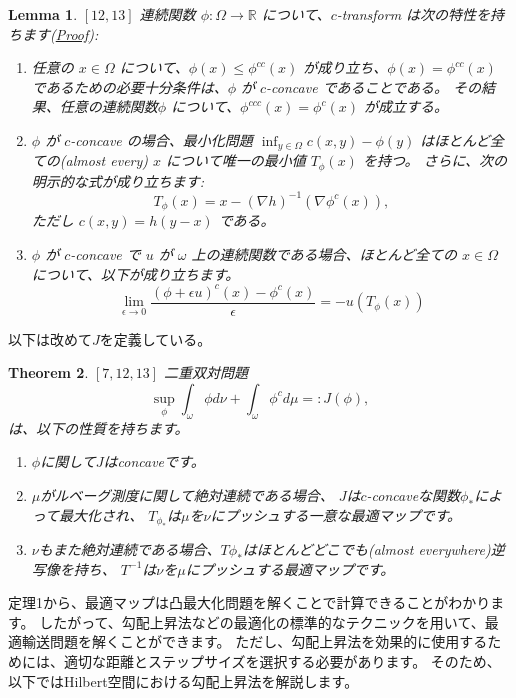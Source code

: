 \documentclass{jsarticle}
\newtheorem{thm}{Theorem}[section]
\newtheorem{lem}[thm]{Lemma}
\theoremstyle{definition}
\begin{document}
\begin{lem}
  \label{lem:c-transform}
  $\left[ 12, 13 \right]$
  連続関数 $\phi: \Omega \to \mathbb{R}$ について、$c$-transform は次の特性を持ちます(\hyperlink{proof:lem:c-transform}{Proof}):
  \begin{enumerate}
  \item 任意の $x \in \Omega$ について、$\phi(x) \le \phi^{cc}(x)$ が成り立ち、$\phi(x) = \phi^{cc}(x)$ であるための必要十分条件は、$\phi$ が $c$-concave であることである。
  その結果、任意の連続関数$\phi$ について、$\phi^{ccc}(x) = \phi^{c}(x)$ が成立する。
  
  \item $\phi$ が $c$-concave の場合、最小化問題 $\inf_{y \in \Omega} c(x, y) - \phi(y)$ はほとんど全ての(almost every) $x$ について唯一の最小値 $T_\phi(x)$ を持つ。
  さらに、次の明示的な式が成り立ちます:
  \begin{equation*}
    T_\phi(x) = x - (\nabla h)^{-1}(\nabla \phi^c(x)),
  \end{equation*}
  ただし $c(x, y) = h(y - x)$ である。
  
  \item $\phi$ が $c$-concave で $u$ が $\omega$ 上の連続関数である場合、ほとんど全ての $x \in \Omega$ について、以下が成り立ちます。
  \begin{equation*}
    \label{eq:c-transform lim}
    \lim_{\epsilon \to 0} \frac{(\phi + \epsilon u)^c(x) - \phi^c(x)}{\epsilon} = - u(T_\phi(x)) 
  \end{equation*}
  \end{enumerate}
\end{lem}

以下は改めて$J$を定義している。
{\color{teal}
\begin{thm}
  $\left[ 7,12,13 \right]$ 
  二重双対問題
  \begin{equation*}
    \sup_\phi \int_\omega \phi  d \nu + \int_\omega \phi^c  d \mu =: J(\phi),
  \end{equation*}
  は、以下の性質を持ちます。

  \begin{enumerate}
    \item $\phi$に関して$J$はconcaveです。
    
    \item $\mu$がルベーグ測度に関して絶対連続である場合、
    $J$は$c$-concaveな関数$\phi_*$によって最大化され、
    $T_{\phi_*}$は$\mu$を$\nu$にプッシュする一意な最適マップです。
    
    \item $\nu$もまた絶対連続である場合、$T\phi_*$はほとんどどこでも(almost everywhere)逆写像を持ち、
    $T^{-1}$は$\nu$を$\mu$にプッシュする最適マップです。
  \end{enumerate}
\end{thm}
}
定理1から、最適マップは凸最大化問題を解くことで計算できることがわかります。
したがって、勾配上昇法などの最適化の標準的なテクニックを用いて、最適輸送問題を解くことができます。
ただし、{\color{red}勾配上昇法を効果的に使用するためには、適切な距離とステップサイズを選択する必要があります。}
そのため、以下ではHilbert空間における勾配上昇法を解説します。
\end{document}
